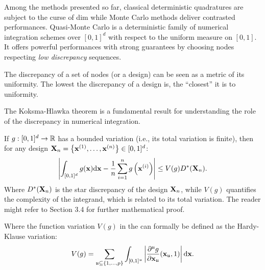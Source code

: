 Among the methods presented so far, classical deterministic quadratures are subject to the curse of dim while Monte Carlo methods deliver contrasted performances. 
Quasi-Monte Carlo is a deterministic family of numerical integration schemes over $[0, 1]^d$ with respect to the uniform measure on $[0, 1]$. 
It offers powerful performances with strong guarantees by choosing nodes respecting \textit{low discrepancy} sequences. 

The discrepancy of a set of nodes (or a design) can be seen as a metric of its uniformity. 
The lowest the discrepancy of a design is, the ``closest'' it is to uniformity. 

The Koksma-Hlawka theorem \citep{morokoff_1995,leobacher_2014} is a fundamental result for understanding the role of the discrepancy in numerical integration. 
\begin{theorem}
    If $g:[0, 1]^d\rightarrow\mathbb{R}$ has a bounded variation (i.e., its total variation is finite), then for any design ${\bf X}_n = \left\{{\bf x}^{(1)}, \dots, {\bf x}^{(n)}\right\} \in [0, 1]^d$:
    \begin{equation}
        \left| \int_{[0, 1]^d} g({\bf x}) \mathrm{d}{\bf x} - \frac1n \sum_{i=1}^n g\left({\bf x}^{(i)}\right)\right| \leq  V(g) D^*({\bf X}_n).
        \label{eq:KH_inequality}
    \end{equation}
    Where $D^*({\bf X}_n)$ is the star discrepancy of the design ${\bf X}_n$, while $V(g)$ quantifies the complexity of the integrand, which is related to its total variation. 
    The reader might refer to \citet{leobacher_2014} Section 3.4 for further mathematical proof.
\end{theorem}

Where the function variation $V(g)$ in the  can formally be defined as the Hardy-Klause variation: 
\begin{equation}
    V(g) = \sum_{\mathfrak{u}\subseteq\{1, \dots, p \}} \int_{[0, 1]^\mathfrak{u}} \left| \frac{\partial^{\mathfrak{u}}g}{\partial {\bf x}_{\mathfrak{u}}}({\bf x}_{\mathfrak{u}}, 1)\right| \mathrm{d}{\bf x}.
\end{equation}

